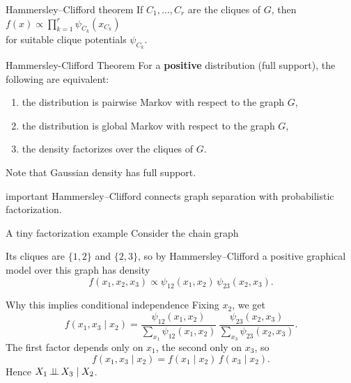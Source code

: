 \documentclass[dvipsnames,aspectratio=169,handout]{beamer}
\begin{document}
\begin{frame}{Hammersley--Clifford theorem}
 If $C_1,\ldots,C_r$ are the cliques of $G$, then\\[2mm]
\qquad\qquad\qquad\qquad\qquad\qquad$
f(x)\propto \prod_{k=1}^r \psi_{C_k}(x_{C_k})
$\\[2mm]
for suitable clique potentials $\psi_{C_k}$.

\begin{block}{Hammersley-Clifford Theorem}
	For a \textbf{positive} distribution (full support), the following are equivalent:
\begin{enumerate}
    \item the distribution is pairwise Markov with respect to the graph $G$,
    \item the distribution is global Markov with respect to the graph $G$,
    \item the density factorizes over the cliques of $G$.
\end{enumerate}
\end{block}
Note that Gaussian density has full support. 


\begin{beamercolorbox}[wd=\textwidth,sep=7pt,center,rounded=true,shadow=true]{important}
Hammersley--Clifford connects graph separation with probabilistic factorization.
\end{beamercolorbox}
\end{frame}

\begin{frame}{A tiny factorization example}
Consider the chain graph
\vspace{-5mm}\begin{center}
\end{center}

Its cliques are $\{1,2\}$ and $\{2,3\}$, so by Hammersley--Clifford a positive graphical model over this graph has density
\[
f(x_1,x_2,x_3)\propto \psi_{12}(x_1,x_2)\,\psi_{23}(x_2,x_3).
\]

\begin{alertblock}{Why this implies conditional independence}
Fixing $x_2$, we get
\[
f(x_1,x_3\mid x_2)= \frac{\psi_{12}(x_1,x_2)}{\sum_{x_1}\psi_{12}(x_1,x_2)}\,\frac{\psi_{23}(x_2,x_3)}{\sum_{x_3}\psi_{23}(x_2,x_3)}.
\]
The first factor depends only on $x_1$, the second only on $x_3$, so 
\[
f(x_1,x_3\mid x_2)=f(x_1\mid x_2)\,f(x_3\mid x_2).
\]
Hence
$
X_1\mbox{\,$\perp\!\!\!\perp$\,} X_3\mid X_2$.

\end{alertblock}

\end{frame}
\end{document}
